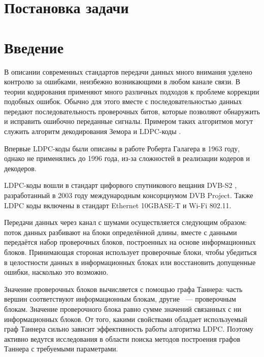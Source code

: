 \documentclass[14pt]{mmcs-article}
\begin{document}


\renewcommand{\contentsname}{Оглавление}

\tableofcontents

\newpage
{}

\section*{Постановка задачи}

\newpage
{}
\section*{Введение}

В описании современных стандартов передачи данных много внимания уделено контролю за ошибками, неизбежно возникающими в любом канале связи. В теории кодирования применяют много различных подходов к проблеме коррекции подобных ошибок. Обычно для этого вместе с последовательностью данных передают последовательность проверочных битов, которые позволяют обнаружить и исправить ошибочно переданные сигналы. Примером таких алгоритмов могут служить алгоритм декодирования Земора \cite{zemor} и LDPC-коды \cite{johnson}.

Впервые LDPC-коды были описаны в работе Роберта Галагера \cite{gallager} в 1963 году, однако не применялись до 1996 года, из-за сложностей в реализации кодеров и декодеров.

LDPC-коды вошли в стандарт цифорвого спутникового вещания DVB-S2 \cite{dvb-s2}, разработанный в 2003 году международным консорциумом DVB Project. Также LDPC коды включены в стандарт Ethernet 10GBASE-T и Wi-Fi 802.11.

Передачи данных через канал с шумами осуществляется следующим образом: поток данных разбивают на блоки определённой длины, вместе с данными передаётся набор проверочных блоков, построенных на основе информационных блоков. Принимающая стороная использует проверочные блоки, чтобы убедиться в целостности данных в информационных блоках или  восстановить допущенные ошибки, насколько это возможно.

Значение проверочных блоков вычисляется с помощью графа Таннера: часть вершин соответствуют информационным блокам, другие ~--- проверочным блокам. Значение проверочного блока равно сумме значений связанных с ни информационных блоков. От того, какими свойствами обладает используемый граф Таннера сильно зависит эффективность работы алгоритма LDPC. Поэтому активно ведутся исследования в области поиска методов построения графов Таннера с требуемыми параметрами.
\end{document}
